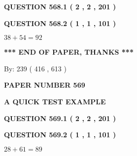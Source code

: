\documentclass[12pt]{article}
\begin{document}
{\textbf{\Large{QUESTION
568.1 
 ( 2 , 2 , 201 )
}}}
  
  
  
\vspace{0.2in}
  
{\textbf{\Large{QUESTION
568.2 
 ( 1 , 1 , 101 )
}}}
  
  
 
 

$ %
38 +  %
54=   %
92$
 
 
   
   
 \vspace{0.2in}
 
   
   
   
   
\vspace{1.0in} 
{\textbf{\large{ *** END OF PAPER, THANKS *** }}} 
   
   
\hspace{1.0in} By: 
 239 ( 416 ,  613 )
   
   
   
   
\newpage 
\setcounter{page}{ 
   569001 } 
   
   
   
   
 {\textbf{ \Large{ PAPER NUMBER  569  }}}
   
   
\vspace{0.2in}
   
   
   
   
   
   
 \vspace{0.2in}
{\LARGE {\textbf{ A QUICK TEST EXAMPLE}}}
   
   
  
\vspace{0.2in}
  
{\textbf{\Large{QUESTION
569.1 
 ( 2 , 2 , 201 )
}}}
  
  
  
\vspace{0.2in}
  
{\textbf{\Large{QUESTION
569.2 
 ( 1 , 1 , 101 )
}}}
  
  
 
 

$ %
28 +  %
61=   %
89$
 
 
   
   
 \vspace{0.2in}
 
   
   
\end{document}
